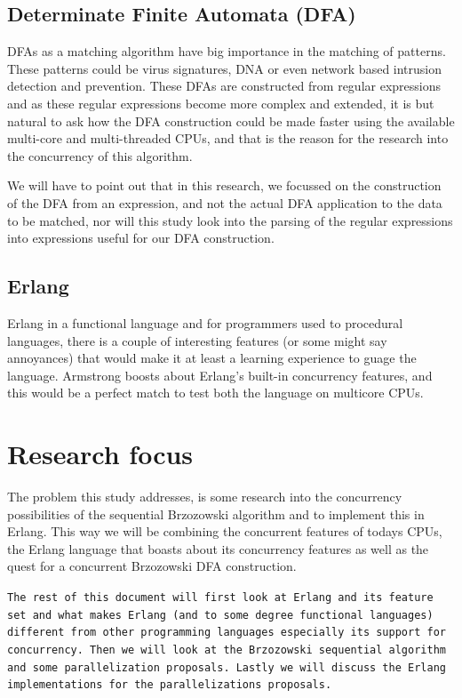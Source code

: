 \documentclass[a4paper,11pt]{report}
\begin{document}
\subsection{Determinate Finite Automata (DFA)}
DFAs as a matching algorithm have big importance in the matching of
patterns. These patterns could be virus signatures, DNA or even
network based intrusion detection and prevention. These DFAs are
constructed from regular expressions and as these regular expressions
become more complex and extended, it is but natural to ask how the DFA
construction could be made faster using the available
multi-core and multi-threaded CPUs, and that is the reason for the
research into the concurrency of this algorithm.

We will have to point out that in this research, we focussed on the
construction of the DFA from an expression, and not the actual DFA
application to the data to be matched, nor will this study look into the parsing of the
regular expressions into expressions useful for our DFA construction.


\subsection{Erlang}

Erlang in a functional language and for programmers used to procedural
languages, there is a couple of
interesting features (or some might say annoyances) that would make it
at least a learning experience to guage the language. Armstrong boosts
about Erlang's built-in
concurrency features, and this would be a perfect match to test both
the language on multicore CPUs.

\section{Research focus}



The problem this study addresses, is some research into the concurrency
possibilities of the sequential Brzozowski algorithm and to implement
this in Erlang. This way we will be combining the concurrent features
of todays CPUs, the Erlang language that boasts about its concurrency
features as well as the quest for a concurrent Brzozowski DFA
construction.

\texttt{The rest of this document will first look at Erlang and its feature
set and what makes Erlang (and to some degree functional languages)
different from other programming languages especially its support for
concurrency. Then we will look at the Brzozowski sequential algorithm
and some parallelization proposals.  Lastly we will discuss the Erlang
implementations for the parallelizations proposals.
}
\end{document}
